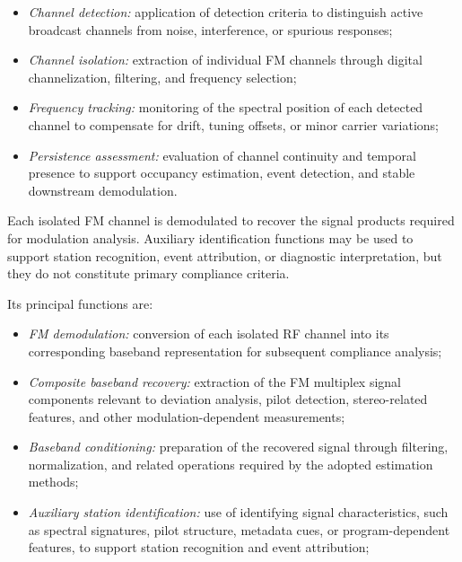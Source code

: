 \documentclass[11pt]{report}
\begin{document}
\begin{description}
\begin{itemize}
		\item \textit{Channel detection:} application of detection criteria to distinguish active broadcast channels from noise, interference, or spurious responses;
		
		\item \textit{Channel isolation:} extraction of individual FM channels through digital channelization, filtering, and frequency selection;
		
		\item \textit{Frequency tracking:} monitoring of the spectral position of each detected channel to compensate for drift, tuning offsets, or minor carrier variations;
		
		\item \textit{Persistence assessment:} evaluation of channel continuity and temporal presence to support occupancy estimation, event detection, and stable downstream demodulation.
	\end{itemize}
	
	\item[Optional Per-Channel Demodulation \& Identification:]
	Each isolated FM channel is demodulated to recover the signal products required for modulation analysis. Auxiliary identification functions may be used to support station recognition, event attribution, or diagnostic interpretation, but they do not constitute primary compliance criteria.
	
	Its principal functions are:
	\begin{itemize}
		\item \textit{FM demodulation:} conversion of each isolated RF channel into its corresponding baseband representation for subsequent compliance analysis;
		
		\item \textit{Composite baseband recovery:} extraction of the FM multiplex signal components relevant to deviation analysis, pilot detection, stereo-related features, and other modulation-dependent measurements;
		
		\item \textit{Baseband conditioning:} preparation of the recovered signal through filtering, normalization, and related operations required by the adopted estimation methods;
		
		\item \textit{Auxiliary station identification:} use of identifying signal characteristics, such as spectral signatures, pilot structure, metadata cues, or program-dependent features, to support station recognition and event attribution;
		

\end{itemize}
\end{description}
\end{document}
